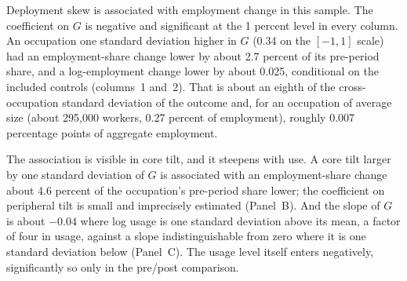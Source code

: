 \documentclass[12pt]{article}
\theoremstyle{plain}
\theoremstyle{definition}
\theoremstyle{remark}
\begin{document}
Deployment skew is associated with employment change in this sample. The coefficient on $G$ is negative
and significant at the 1 percent level in every column. An occupation one
standard deviation higher in $G$ (0.34 on the $[-1,1]$ scale) had an
employment-share change lower by about 2.7 percent of its pre-period
share, and a log-employment change lower by about 0.025, conditional on
the included controls (columns~1 and~2). That is about an eighth of the cross-occupation standard
deviation of the outcome and, for an occupation of average size (about
295,000 workers, 0.27 percent of employment), roughly 0.007 percentage
points of aggregate employment.

The association is visible in core tilt, and it steepens with use. A core
tilt larger by
one standard deviation of $G$ is associated with an employment-share
change about 4.6 percent of the occupation's pre-period share lower; the coefficient on peripheral tilt is small and
imprecisely estimated (Panel~B). And the slope of $G$ is about $-0.04$
where log usage is one standard deviation above its mean, a factor of four
in usage, against a slope indistinguishable from zero where it is one
standard deviation below (Panel~C). The usage level itself enters
negatively, significantly so only in the pre/post comparison.
\end{document}
